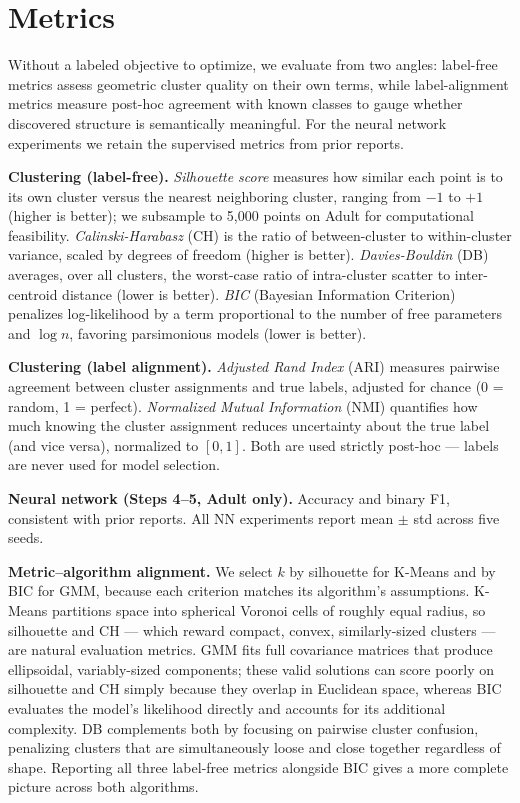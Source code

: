 \documentclass[conference]{IEEEtran}
\begin{document}
\section{Metrics}

Without a labeled objective to optimize, we evaluate from two angles:
label-free metrics assess geometric cluster quality on their own terms,
while label-alignment metrics measure post-hoc agreement with known
classes to gauge whether discovered structure is semantically
meaningful. For the neural network experiments we retain the supervised
metrics from prior reports.

\textbf{Clustering (label-free).} \emph{Silhouette score} measures how
similar each point is to its own cluster versus the nearest neighboring
cluster, ranging from $-1$ to $+1$ (higher is better); we subsample to
5{,}000 points on Adult for computational feasibility.
\emph{Calinski-Harabasz} (CH) is the ratio of between-cluster to
within-cluster variance, scaled by degrees of freedom (higher is
better). \emph{Davies-Bouldin} (DB) averages, over all clusters, the
worst-case ratio of intra-cluster scatter to inter-centroid distance
(lower is better). \emph{BIC} (Bayesian Information Criterion)
penalizes log-likelihood by a term proportional to the number of
free parameters and $\log n$, favoring parsimonious models (lower is
better).

\textbf{Clustering (label alignment).} \emph{Adjusted Rand Index}
(ARI) measures pairwise agreement between cluster assignments and true
labels, adjusted for chance (0 = random, 1 = perfect).
\emph{Normalized Mutual Information} (NMI) quantifies how much knowing
the cluster assignment reduces uncertainty about the true label (and
vice versa), normalized to $[0,1]$. Both
are used strictly post-hoc --- labels are never used for model
selection.

\textbf{Neural network (Steps 4--5, Adult only).} Accuracy and binary
F1, consistent with prior reports. All NN experiments report mean
$\pm$ std across five seeds.

\textbf{Metric--algorithm alignment.} We select $k$ by silhouette for
K-Means and by BIC for GMM, because each criterion matches its
algorithm's assumptions. K-Means partitions space into spherical
Voronoi cells of roughly equal radius, so silhouette and CH --- which
reward compact, convex, similarly-sized clusters --- are natural
evaluation metrics. GMM fits full covariance matrices that produce
ellipsoidal, variably-sized components; these valid solutions can
score poorly on silhouette and CH simply because they overlap in
Euclidean space, whereas BIC evaluates the model's likelihood directly
and accounts for its additional complexity. DB complements both by
focusing on pairwise cluster confusion, penalizing clusters that are
simultaneously loose and close together regardless of shape. Reporting
all three label-free metrics alongside BIC gives a more complete
picture across both algorithms.
\end{document}
